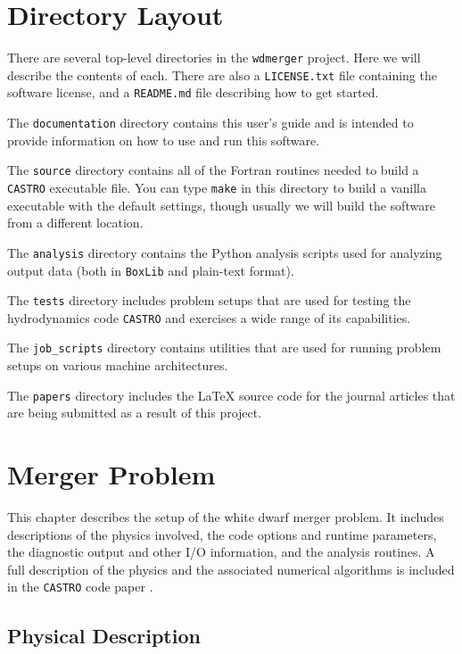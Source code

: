 \documentclass[12pt]{book}
\begin{document}
\chapter{Directory Layout}

There are several top-level directories in the \texttt{wdmerger} project. Here we will describe
the contents of each. There are also a \texttt{LICENSE.txt} file containing the software license,
and a \texttt{README.md} file describing how to get started.

The \texttt{documentation} directory contains this user's guide and is intended to provide information
on how to use and run this software.

The \texttt{source} directory contains all of the Fortran routines needed to build a \texttt{CASTRO} 
executable file. You can type \texttt{make} in this directory to build a vanilla executable 
with the default settings, though usually we will build the software from a different location.

The \texttt{analysis} directory contains the Python analysis scripts used for analyzing output
data (both in \texttt{BoxLib} and plain-text format). 

The \texttt{tests} directory includes problem setups that are used for testing 
the hydrodynamics code \texttt{CASTRO} and exercises a wide range of its capabilities.

The \texttt{job\_scripts} directory contains utilities that are used for running
problem setups on various machine architectures.

The \texttt{papers} directory includes the LaTeX source code for the journal articles
that are being submitted as a result of this project.



\chapter{Merger Problem}

This chapter describes the setup of the white dwarf merger problem. It includes descriptions of 
the physics involved, the code options and runtime parameters, the diagnostic output 
and other I/O information, and the analysis routines. A full description of the physics 
and the associated numerical algorithms is included in the \texttt{CASTRO} code paper \cite{castro}.

\section{Physical Description}
\end{document}
